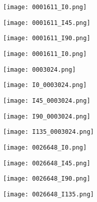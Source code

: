 \begin{figure}
	\centering
	\begin{subfigure}{.11\textwidth}
		\centering
		\texttt{[image: 0001611\_I0.png]}
	\end{subfigure}%
	\begin{subfigure}{.11\textwidth}
		\centering
		\texttt{[image: 0001611\_I45.png]}
	\end{subfigure}%
	\begin{subfigure}{.11\textwidth}
		\centering
		\texttt{[image: 0001611\_I90.png]}
	\end{subfigure}%
	\begin{subfigure}{.11\textwidth}
		\centering
		\texttt{[image: 0001611\_I0.png]}
	\end{subfigure}%
	\begin{subfigure}{.105\textwidth}
		\centering
		\texttt{[image: 0003024.png]}
	\end{subfigure}%
	\begin{subfigure}{.105\textwidth}
		\centering
		\texttt{[image: I0\_0003024.png]}
	\end{subfigure}%
	\begin{subfigure}{.105\textwidth}
		\centering
		\texttt{[image: I45\_0003024.png]}
	\end{subfigure}%
	\begin{subfigure}{.105\textwidth}
		\centering
		\texttt{[image: I90\_0003024.png]}
	\end{subfigure}%
	\begin{subfigure}{.105\textwidth}
		\centering
		\texttt{[image: I135\_0003024.png]}
	\end{subfigure}
	\begin{subfigure}{.11\textwidth}
		\centering
		\texttt{[image: 0026648\_I0.png]}
	\end{subfigure}%
	\begin{subfigure}{.11\textwidth}
		\centering
		\texttt{[image: 0026648\_I45.png]}
	\end{subfigure}%
	\begin{subfigure}{.11\textwidth}
		\centering
		\texttt{[image: 0026648\_I90.png]}
	\end{subfigure}%
	\begin{subfigure}{.11\textwidth}
		\centering
		\texttt{[image: 0026648\_I135.png]}

\end{subfigure}
\end{figure}

